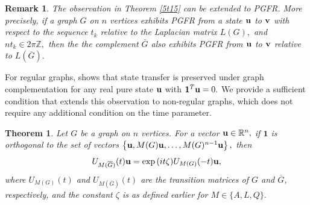 \documentclass[12pt,a4paper]{article}
\newtheorem{thm}{Theorem}
\newtheorem{exm}{Example}
\newtheorem{rem}{Remark}
\def \e {{\bf e}}
\def \u {{\bf u}}
\def \v {{\bf v}}
\def \e {{\mathbf e}}
\newcommand{\cb}[1]{\left\lbrace #1\right\rbrace}
\begin{document}
\begin{rem}\label{5remark2}
 The observation in Theorem \ref{5t15} can be extended to PGFR. More precisely, if a graph $G$ on $n$ vertices exhibits PGFR from a state $\u$ to $\v$ with respect to the sequence $t_k$ relative to the Laplacian matrix $L(G),$ and $nt_k\in 2\pi\mathbb{Z},$ then the the complement $\overline G$ also exhibits PGFR from $\u$ to $\v$ relative to $L(\overline{G}).$ 
 \end{rem}
For regular graphs, \cite[Lemma 3]{pal11} shows that state transfer is preserved under graph complementation for any real pure state $\u$ with $\mathbf{1}^T\u=0.$ 
 We provide a sufficient condition that extends this observation to non-regular graphs,
which does not require any additional condition on the time parameter. 
\begin{thm}\label{5th2}
Let $G$ be a graph on $n$ vertices. For a vector $\u\in\mathbb{R}^n,$
  if $\mathbf{1}$ is orthogonal to the set of vectors $\cb{\u,M(G)\u,\ldots, M(G)^{n-1}\u},$ then
   \[U_{M(\overline{G})}(t)\u=\exp{(it\zeta)} U_{M(G)}(-t)\u,\]
 where $U_{M(G)}(t)$ and $U_{M(\overline{G})}(t)$ are the transition matrices of $G$ and $\overline{G}$, respectively, and  the constant $\zeta$ is as defined earlier for $M\in\{A,L,Q\}.$
 \end{thm}
\end{document}
